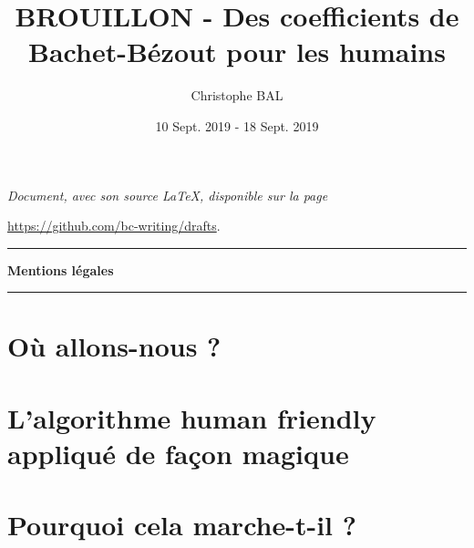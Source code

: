 \documentclass[12pt]{amsart}
\begin{document}
\title{BROUILLON - Des coefficients de Bachet-Bézout pour les humains}
\author{Christophe BAL}
\date{10 Sept. 2019 - 18 Sept. 2019}

\maketitle

\begin{center}
    \itshape
    Document, avec son source \LaTeX, disponible sur la page
    
    \url{https://github.com/bc-writing/drafts}.
\end{center}


\bigskip


\begin{center}
    \hrule\vspace{.3em}
    {
        \fontsize{1.35em}{1em}\selectfont
        \textbf{Mentions \og légales \fg}
    }
            
    \vspace{0.45em}
    \doclicenseThis
    \hrule
\end{center}


\vspace{4em}


\setcounter{tocdepth}{2}
\tableofcontents




\newpage
\section{Où allons-nous ?}






\newpage
\section{L'algorithme \og human friendly \fg{} appliqué de façon magique}






\newpage
\section{Pourquoi cela marche-t-il ?}




\end{document}

